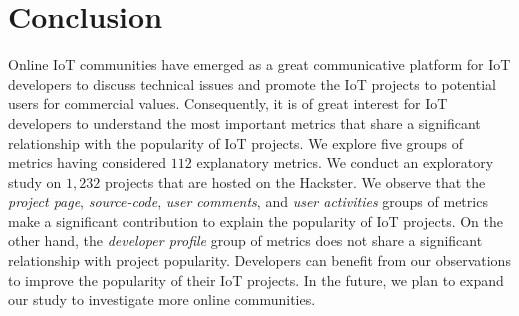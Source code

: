 \section{Conclusion}\label{section:conclusion}
\begin{comment}
\end{comment}

Online IoT communities have emerged as a great communicative platform for IoT
developers to discuss technical issues and promote the IoT projects to
potential users for commercial values. Consequently, it is of great interest
for IoT developers to understand the most important metrics that share a
	significant relationship with the popularity of IoT projects.  We
	explore five groups of metrics having considered $112$ explanatory
	metrics. We conduct an exploratory study on $1,232$ projects that are
	hosted on the Hackster.  We observe that the {\em project page}, {\em
	source-code}, {\em user comments}, and {\em user activities} groups of
	metrics make a significant contribution to explain the popularity of
	IoT projects. On the other hand, the {\em developer profile} group of
	metrics does not share a significant relationship with project
	popularity. Developers can benefit from our observations to improve
	the popularity of their IoT projects.  In the future, we plan to expand
	our study to investigate more online communities.
